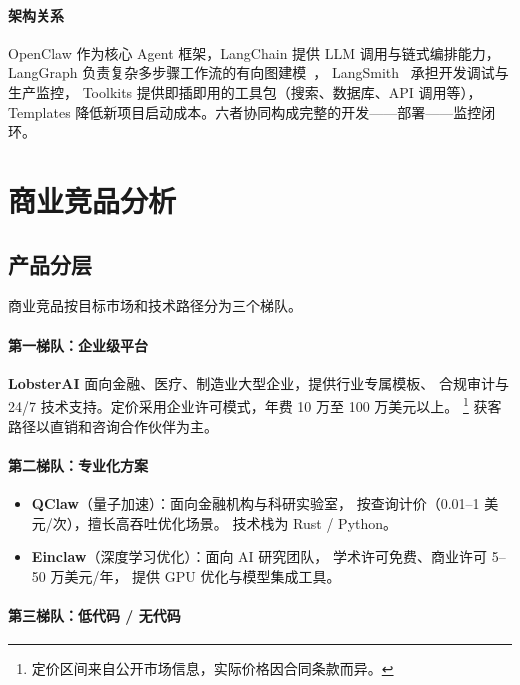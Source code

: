 \documentclass[
  customlatinfont = macos,
]{hkustthesis}
\begin{document}
\paragraph{架构关系}
OpenClaw 作为核心 Agent 框架，LangChain 提供 LLM 调用与链式编排能力，
LangGraph 负责复杂多步骤工作流的有向图建模~\cite{langgraph2024}，
LangSmith~\cite{langsmith2024} 承担开发调试与生产监控，
Toolkits 提供即插即用的工具包（搜索、数据库、API 调用等），
Templates 降低新项目启动成本。六者协同构成完整的开发——部署——监控闭环。


\section{商业竞品分析}

\subsection{产品分层}

商业竞品按目标市场和技术路径分为三个梯队。

\paragraph{第一梯队：企业级平台}

\textbf{LobsterAI} 面向金融、医疗、制造业大型企业，提供行业专属模板、
合规审计与 24/7 技术支持。定价采用企业许可模式，年费 10 万至 100 万美元以上。%
\footnote{定价区间来自公开市场信息，实际价格因合同条款而异。}
获客路径以直销和咨询合作伙伴为主。

\paragraph{第二梯队：专业化方案}

\begin{itemize}[nosep]
  \item \textbf{QClaw}（量子加速）：面向金融机构与科研实验室，
        按查询计价（0.01--1 美元/次），擅长高吞吐优化场景。
        技术栈为 Rust / Python。
  \item \textbf{Einclaw}（深度学习优化）：面向 AI 研究团队，
        学术许可免费、商业许可 5--50 万美元/年，
        提供 GPU 优化与模型集成工具。
\end{itemize}

\paragraph{第三梯队：低代码 / 无代码}
\end{document}
